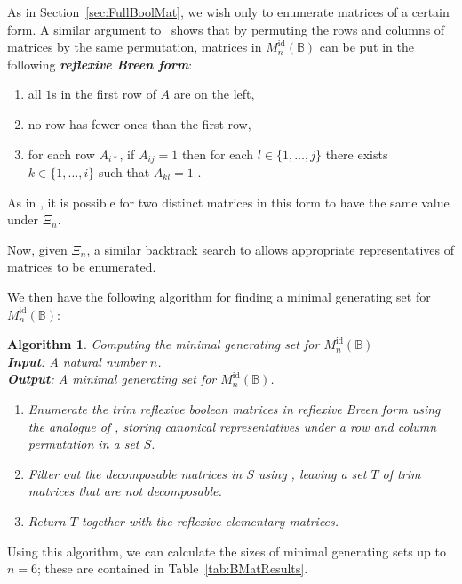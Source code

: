 \documentclass[11pt]{article}
\newtheorem{algo}[thm]{Algorithm}
\newenvironment{alg}{\begin{algo}\rm}{\end{algo}}
\newcommand{\defn}[1]{\textbf{\textit{#1}}}
\numberwithin{equation}{section}
\newcommand{\B}{\mathbb{B}}
\newcommand{\Refln}{M_n^{\text{id}}(\B)}
\begin{document}
As in Section~\ref{sec:FullBoolMat}, we wish only to enumerate matrices of a
certain form. A similar argument to~\cite[Proposition~3.6]{Breen1997aa} shows
that by permuting the rows and columns of matrices by the same permutation,
matrices in $\Refln$ can be put in the following \defn{reflexive Breen form}:

\begin{enumerate}[label={\rm (\roman*)}]
  \item{all $1$s in the first row of $A$ are on the left,}
  \item{no row has fewer ones than the first row,}
  \item{for each row $A_{i*}$, if $A_{ij} = 1$ then for each $l \in \{1, \ldots,
        j\}$ there exists $k \in \{1, \ldots, i\}$ such that $A_{kl} = 1$ .}
\end{enumerate}

As in , it is possible for two distinct matrices
in this form to have the same value under $\Xi_n$.

Now, given $\Xi_n$, a similar backtrack search to 
allows appropriate representatives of matrices to be enumerated.

We then have the following algorithm for finding a minimal generating set for
$\Refln$:
\begin{alg}
  Computing the minimal generating set for $\Refln$ \\
  \textbf{Input}: A natural number $n$.\\
  \textbf{Output}: A minimal generating set for $\Refln$.
\begin{enumerate}
  \item
    Enumerate the trim reflexive boolean matrices in reflexive Breen form using
    the analogue of , storing canonical
    representatives under a row and column permutation in a set $S$.
  \item 
    Filter out the decomposable matrices in $S$ using
    , leaving a set $T$ of trim matrices that
    are not decomposable.
  \item
    Return $T$ together with the reflexive elementary matrices.
\end{enumerate}
\end{alg}
Using this algorithm, we can calculate the sizes of minimal generating sets up
to $n = 6$; these are contained in Table~\ref{tab:BMatResults}.
\end{document}
